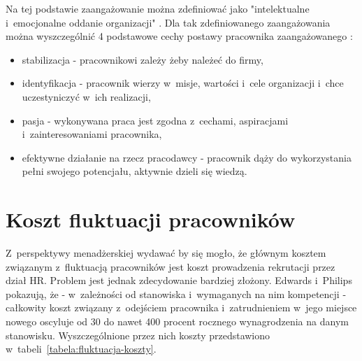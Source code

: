 Na tej podstawie zaangażowanie można zdefiniować jako "intelektualne i~emocjonalne oddanie organizacji" \cite{juchnowicz-2010}.
Dla tak zdefiniowanego zaangażowania można wyszczególnić 4 podstawowe cechy postawy pracownika zaangażowanego \cite{juchnowicz-2010}:
\begin{itemize}
    \item stabilizacja - pracownikowi zależy żeby należeć do firmy,
    \item identyfikacja - pracownik wierzy w~misje, wartości i~cele organizacji i~chce uczestyniczyć w~ich realizacji,
    \item pasja - wykonywana praca jest zgodna z~cechami, aspiracjami i~zainteresowaniami pracownika,
    \item efektywne działanie na rzecz pracodawcy - pracownik dąży do wykorzystania pełni swojego potencjału, aktywnie dzieli się wiedzą.
\end{itemize}



\section{Koszt fluktuacji pracowników}\label{sec:koszt-fluktuacji}

Z~perspektywy menadżerskiej wydawać by się mogło, że głównym kosztem związanym z~fluktuacją pracowników jest koszt prowadzenia rekrutacji przez dział HR.
Problem jest jednak zdecydowanie bardziej złożony.
Edwards i~Philips \cite{philips-edwards-2009} pokazują, że - w~zależności od stanowiska i~wymaganych na nim kompetencji -
całkowity koszt związany z~odejściem pracownika i~zatrudnieniem w~jego miejsce nowego oscyluje od 30 do nawet 400 procent
rocznego wynagrodzenia na danym stanowisku. Wyszczególnione przez nich koszty przedstawiono w~tabeli~\ref{tabela:fluktuacja-koszty}.

